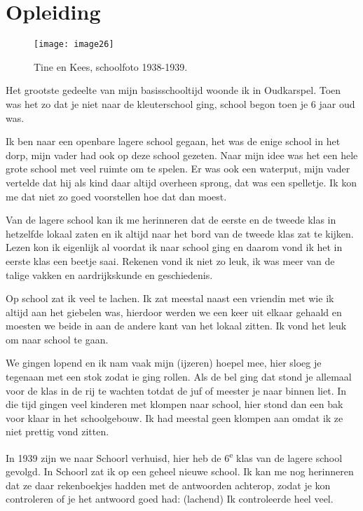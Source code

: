 \chapter*{Opleiding}

\begin{figure}[h]
    \texttt{[image: image26]}
    \caption{Tine en Kees, schoolfoto 1938-1939.}
\end{figure}

Het grootste gedeelte van mijn basisschooltijd woonde ik in Oudkarspel. Toen was het zo dat je niet naar de kleuterschool ging, school begon toen je 6 jaar oud was. 

Ik ben naar een openbare lagere school gegaan, het was de enige school in het dorp, mijn vader had ook op deze school gezeten. Naar mijn idee was het een hele grote school met veel ruimte om te spelen. Er was ook een waterput, mijn vader vertelde dat hij als kind daar altijd overheen sprong, dat was een spelletje. Ik kon me dat niet zo goed voorstellen hoe dat dan moest. 

Van de lagere school kan ik me herinneren dat de eerste en de tweede klas in hetzelfde lokaal zaten en ik altijd naar het bord van de tweede klas zat te kijken. Lezen kon ik eigenlijk al voordat ik naar school ging en daarom vond ik het in eerste klas een beetje saai. Rekenen vond ik niet zo leuk, ik was meer van de talige vakken en aardrijkskunde en geschiedenis. 

Op school zat ik veel te lachen. Ik zat meestal naast een vriendin met wie ik altijd aan het giebelen was, hierdoor werden we een keer uit elkaar gehaald en moesten we beide in aan de andere kant van het lokaal zitten. Ik vond het leuk om naar school te gaan. 

We gingen lopend en ik nam vaak mijn (ijzeren) hoepel mee, hier sloeg je tegenaan met een stok zodat ie ging rollen. Als de bel ging dat stond je allemaal voor de klas in de rij te wachten totdat de juf of meester je naar binnen liet. In die tijd gingen veel kinderen met klompen naar school, hier stond dan een bak voor klaar in het schoolgebouw. Ik had meestal geen klompen aan omdat ik ze niet prettig vond zitten. 

In 1939 zijn we naar Schoorl verhuisd, hier heb de 6\textsuperscript{e} klas van de lagere school gevolgd. In Schoorl zat ik op een geheel nieuwe school. Ik kan me nog herinneren dat ze daar rekenboekjes hadden met de antwoorden achterop, zodat je kon controleren of je het antwoord goed had: (lachend) Ik controleerde heel veel.

